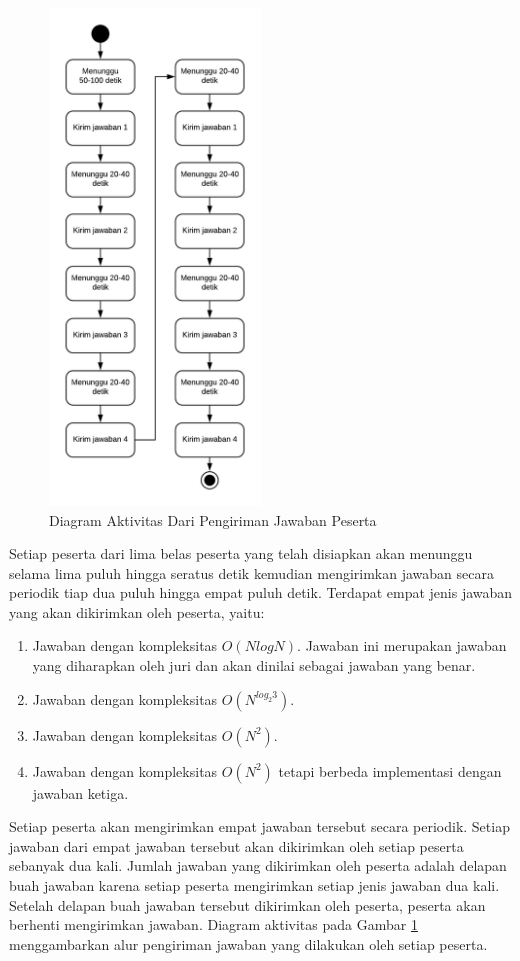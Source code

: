 \begin{figure}[ht!]
    \centering
    \includegraphics[width=0.5\textwidth]{images/performance-testing-activity}
    \caption{Diagram Aktivitas Dari Pengiriman Jawaban Peserta}
    \label{fig:performance-testing-activity}
\end{figure}

\par Setiap peserta dari lima belas peserta yang telah disiapkan akan menunggu selama lima puluh hingga seratus detik kemudian mengirimkan jawaban secara periodik tiap dua puluh hingga empat puluh detik. Terdapat empat jenis jawaban yang akan dikirimkan oleh peserta, yaitu:
\begin{enumerate}
    \item Jawaban dengan kompleksitas $O(N log N)$. Jawaban ini merupakan jawaban yang diharapkan oleh juri dan akan dinilai sebagai jawaban yang benar.
    \item Jawaban dengan kompleksitas $O(N^{log_2{3}})$.
    \item Jawaban dengan kompleksitas $O(N^2)$.
    \item Jawaban dengan kompleksitas $O(N^2)$ tetapi berbeda implementasi dengan jawaban ketiga.
\end{enumerate}
Setiap peserta akan mengirimkan empat jawaban tersebut secara periodik. Setiap jawaban dari empat jawaban tersebut akan dikirimkan oleh setiap peserta sebanyak dua kali. Jumlah jawaban yang dikirimkan oleh peserta adalah delapan buah jawaban karena setiap peserta mengirimkan setiap jenis jawaban dua kali. Setelah delapan buah jawaban tersebut dikirimkan oleh peserta, peserta akan berhenti mengirimkan jawaban. Diagram aktivitas pada Gambar \ref{fig:performance-testing-activity} menggambarkan alur pengiriman jawaban yang dilakukan oleh setiap peserta.

